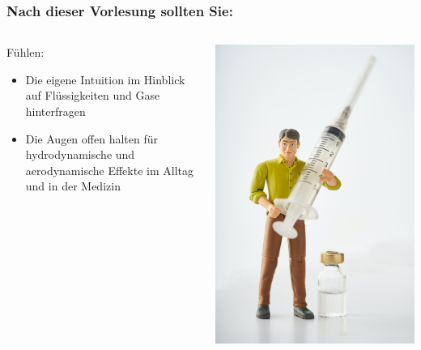 \documentclass{beamer}
\begin{document}
\begin{frame}

\frametitle{Nach dieser Vorlesung sollten Sie:}
 

 


\begin{columns}[c]

\begin{column}{7cm}
\begin{block}{Fühlen:}

\begin{itemize}
\item
Die eigene Intuition im Hinblick auf Flüssigkeiten und Gase hinterfragen
\item
Die Augen offen halten für hydrodynamische und aerodynamische Effekte im Alltag und in der Medizin
\end{itemize}

\end{block}

\end{column}

\begin{column}{4cm}
\begin{center}
\includegraphics[width=\textwidth]{action_figure_needle.jpg}
\end{center}


\end{column}
\end{columns}
\end{frame}
\end{document}
